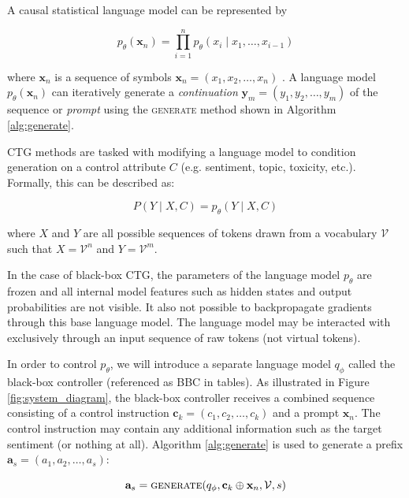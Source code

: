 \documentclass[phd,electronic,oneside,twosidetoc,letterpaper,chaptercenter,parttop,lof]{byumsphd}
\begin{document}
 A causal statistical language model can be represented by 

\begin{equation}
p_{\theta}(\mathbf{x}_n) = \prod_{i=1}^{n} p_{\theta}(x_i \mid x_1, \ldots, x_{i - 1})
\end{equation}

where \(\mathbf{x}_n\) is a sequence of symbols \(\mathbf{x}_n = (x_1, x_2, \ldots, x_n)\) \cite{bengio2000neural}.
A language model \(p_\theta(\mathbf{x}_n)\) can iteratively generate a \emph{continuation} \(\mathbf{y}_m = (y_1, y_2, \ldots, y_m)\) of the sequence or \emph{prompt} using the \textsc{generate} method shown in Algorithm \ref{alg:generate}.

CTG methods are tasked with modifying a language model to condition generation on a control attribute \(C\) (e.g. sentiment, topic, toxicity, etc.). Formally, this can be described as:

\begin{equation}
    P(Y \mid X, C) = p_\theta(Y \mid X, C)
\end{equation}

where \(X\) and \(Y\) are all possible sequences of tokens drawn from a vocabulary \(\mathcal{V}\) such that \(X = \mathcal{V}^{n}\) and \(Y = \mathcal{V}^m\).

In the case of black-box CTG, the parameters of the language model \(p_\theta\) are frozen and all internal model features such as hidden states and output probabilities are not visible. It also not possible to backpropagate gradients through this base language model. The language model may be interacted with exclusively through an input sequence of raw tokens (not virtual tokens).


In order to control \(p_\theta\), we will introduce a separate language model \(q_\phi\) called the black-box controller (referenced as BBC in tables). As illustrated in Figure \ref{fig:system_diagram}, the black-box controller receives a combined sequence consisting of a control instruction \(\mathbf{c}_k = (c_1, c_2, \ldots, c_k)\) and a prompt \(\mathbf{x}_n\). The control instruction may contain any additional information such as the target sentiment (or nothing at all). Algorithm \ref{alg:generate} is used to generate a prefix \(\mathbf{a}_s = (a_1, a_2, \ldots, a_s)\):

\begin{equation}
    \mathbf{a}_s = \textrm{\textsc{generate}}(q_\phi, \mathbf{c}_k \oplus \mathbf{x}_n, \mathcal{V}, s)
\end{equation}
\end{document}
